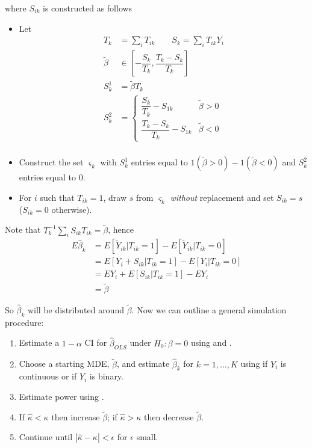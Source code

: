 \documentclass{article}
\begin{document}
where $S_{ik}$ is constructed as follows
\begin{itemize}
  \item Let
    \begin{align*}
    T_k & = \sum^{}_{i} T_{ik}
    \quad\quad
    S_k = \sum^{}_{i} T_{ik} Y_i
    \\
    \widetilde{\beta} & \in \left[-\dfrac{S_k}{T_k}, \dfrac{T_k - S_k}{T_k}\right] \\
    S^1_k & = \widetilde{\beta} T_k \\
    S^2_k & =
      \begin{cases}
      \dfrac{S_k}{T_k} - S_{1k} & \widetilde{\beta} > 0  \\[9pt]
        \dfrac{T_k - S_k}{T_k} - S_{1k} & \widetilde{\beta} < 0
    \end{cases} \\
    \end{align*}

  \item Construct the set $\varsigma_k$ with $S^1_k$ entries equal to $1(\widetilde{\beta} > 0) - 1(\widetilde{\beta} < 0)$ and $S^2_k$ entries equal to $0$.

  \item For $i$ such that $T_{ik} = 1$, draw $s$ from $\varsigma_k$ \textit{without} replacement and set $S_{ik} = s$ ($S_{ik} = 0$ otherwise).
\end{itemize}

Note that $T^{-1}_k \sum^{}_{i} S_{ik} T_{ik} = \widetilde{\beta}$, hence
\begin{align*}
E\widehat{\beta}_k & = E\left[\widetilde{Y}_{ik} | T_{ik} = 1\right] - E\left[\widetilde{Y}_{ik} | T_{ik} = 0\right] \\
& = E\left[Y_i + S_{ik} | T_{ik} = 1\right] - E\left[Y_i | T_{ik} = 0\right] \\
& = EY_i + E\left[S_{ik} | T_{ik} = 1\right] - EY_i \\
& = \widetilde{\beta}
\end{align*}

So $\widehat{\beta}_k$ will be distributed around $\widetilde{\beta}$. Now we can outline a general simulation procedure:
\begin{enumerate}
\item Estimate a $1 - \alpha$ CI for $\widehat{\beta}_{OLS}$ under $H_0: \beta = 0$ using  and .

\item Choose a starting MDE, $\widetilde{\beta}$, and estimate $\widehat{\beta}_k$ for $k = 1, \ldots, K$ using  if $Y_i$ is continuous or  if $Y_i$ is binary.

\item Estimate power using .

\item If $\widehat{\kappa} < \kappa$ then increase $\widetilde{\beta}$; if $\widehat{\kappa} > \kappa$ then decrease $\widetilde{\beta}$.

\item Continue until $\left|\widehat{\kappa} - \kappa\right| < \epsilon$ for $\epsilon$ small.
\end{enumerate}
\end{document}
